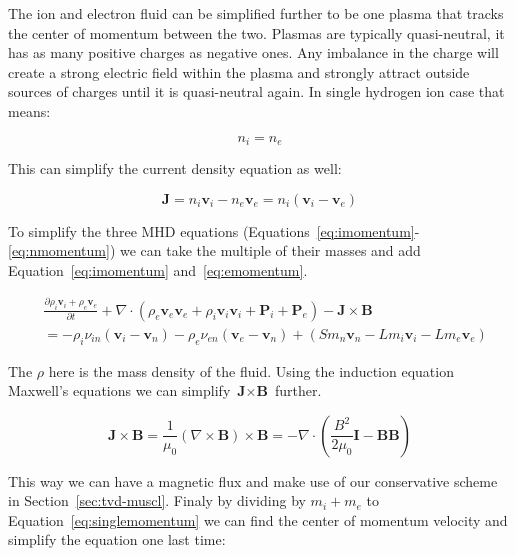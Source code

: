 \documentclass[12pt,upcase]{umlthesis}
\begin{document}
The ion and electron fluid can be simplified further to be one plasma that tracks the center of momentum between the two. Plasmas are typically quasi-neutral, it has as many positive charges as negative ones. Any imbalance in the charge will create a strong electric field within the plasma and strongly attract outside sources of charges until it is quasi-neutral again. In single hydrogen ion case that means:


\begin{equation}\label{eq:quasineutrality}
	n_i = n_e
\end{equation}

This can simplify the current density equation as well:

\begin{equation}\label{eq:currentdensity}
	\textbf{J} = n_i \textbf{v}_i - n_e \textbf{v}_e = n_i (\textbf{v}_i - \textbf{v}_e)
\end{equation}

To simplify the three MHD equations (Equations~\ref{eq:imomentum}-\ref{eq:nmomentum}) we can take the multiple of their masses and add Equation~\ref{eq:imomentum} and~\ref{eq:emomentum}.

\begin{equation}\label{eq:singlemomentum}
	\begin{aligned}
		& \frac{\partial \rho_i \textbf{v}_i + \rho_e \textbf{v}_e}{\partial t} + \nabla \cdot (\rho_e \textbf{v}_e \textbf{v}_e + \rho_i \textbf{v}_i \textbf{v}_i + \textbf{P}_i + \textbf{P}_e) - \textbf{J} \times \textbf{B} \\
		& = - \rho_i \nu_{in}(\textbf{v}_i - \textbf{v}_n) - \rho_e \nu_{en} (\textbf{v}_e - \textbf{v}_n)+ (S m_n \textbf{v}_n - L m_i \textbf{v}_i - L m_e \textbf{v}_e)
\end{aligned}
\end{equation}

The $\rho$ here is the mass density of the fluid. Using the induction equation Maxwell's equations we can simplify $\textbf{J} \times \textbf{B}$ further.

\begin{equation}
	\textbf{J} \times \textbf{B} = \frac{1}{\mu_0} (\nabla \times \textbf{B}) \times \textbf{B} = -\nabla \cdot (\frac{B^2}{2\mu_0}\textbf{I} - \textbf{BB})
\end{equation}

This way we can have a magnetic flux and make use of our conservative scheme in Section~\ref{sec:tvd-muscl}. Finaly by dividing by $m_i+m_e$ to Equation~\ref{eq:singlemomentum} we can find the center of momentum velocity and simplify the equation one last time:
\end{document}
